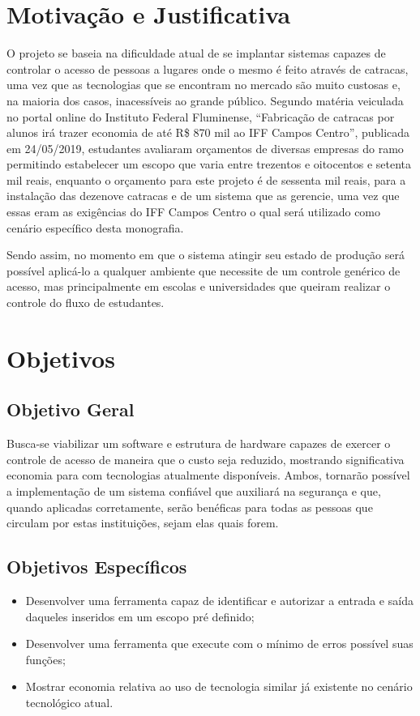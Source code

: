 \section{Motivação e Justificativa}

O projeto se baseia na dificuldade atual de se implantar sistemas capazes de controlar o acesso de pessoas a lugares onde o mesmo é feito através de catracas,
uma vez que as tecnologias que se encontram no mercado são muito custosas e,
na maioria dos casos, inacessíveis ao grande público. Segundo matéria veiculada
no portal online do Instituto Federal Fluminense, “Fabricação de catracas por
alunos irá trazer economia de até R\$ 870 mil ao IFF Campos Centro”, publicada
em 24/05/2019, estudantes avaliaram orçamentos de diversas empresas do ramo permitindo
estabelecer um escopo que varia entre trezentos e oitocentos e setenta mil reais,
enquanto o orçamento para este projeto é de sessenta mil reais, para a instalação
das dezenove catracas e de um sistema que as gerencie, uma vez que essas eram as exigências do IFF Campos Centro o qual será utilizado como cenário específico desta monografia.


Sendo assim, no momento em que o sistema atingir seu estado de produção será possível
aplicá-lo a qualquer ambiente que necessite de um controle genérico de acesso, mas
principalmente em escolas e universidades que queiram realizar o
controle do fluxo de estudantes.

\section{Objetivos}
\subsection{Objetivo Geral}
Busca-se viabilizar um software e estrutura de hardware capazes de exercer o controle de acesso de maneira que o custo seja reduzido, mostrando significativa economia para com tecnologias atualmente disponíveis. Ambos, tornarão
possível a implementação de um sistema confiável que auxiliará na segurança e que,
quando aplicadas corretamente, serão benéficas para todas as pessoas que circulam
por estas instituições, sejam elas quais forem. 
\subsection{Objetivos Específicos}
\begin{itemize}
    \item Desenvolver uma ferramenta capaz de identificar e autorizar a entrada e saída daqueles
    inseridos em um escopo pré definido;
    \item Desenvolver uma ferramenta que execute com o mínimo de erros possível suas funções;
    \item Mostrar economia relativa ao uso de tecnologia similar já existente no cenário tecnológico atual.
\end{itemize}        
    
